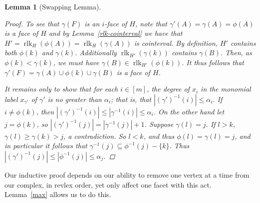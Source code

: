 \documentclass[11pt]{amsart}
\newtheorem{lemma}[theorem]{Lemma}
\theoremstyle{definition}
\numberwithin{equation}{section}
\theoremstyle{remark}
\numberwithin{equation}{section}
\begin{document}
\begin{lemma}[Swapping Lemma]
\begin{proof}
To see that $\gamma(F)$ is an $i$-face of $H$, note that $\gamma'(A) = \gamma(A) = \phi(A)$ is a face of $H$ and by Lemma~\ref{rlk-cointerval} we have that $H' = \operatorname{rlk}_{H}(\phi(A)) = \operatorname{rlk}_{H}(\gamma(A)) $ is cointerval.
By definition, $H'$ contains both $\phi(k)$ and $\gamma(k)$.
Additionally $\operatorname{rlk}_{H'}(\gamma(k))$ contains $\gamma(B)$. 
Then, as $\phi(k) < \gamma(k)$, we must have $\gamma(B) \in \operatorname{rlk}_{H'}(\phi(k))$. 
It thus follows that $\gamma'(F) = \gamma(A) \cup \phi(k) \cup \gamma(B)$ is a face of $H$. 

It remains only to show that for each $i \in [m]$, the degree of $x_i$ in the monomial label $x_{\gamma'}$ of $\gamma'$ is no greater than $\alpha_i$; that is, that $|(\gamma')^{-1}(i)| \leq \alpha_i$. 
If $i \neq \phi(k)$, then $|(\gamma')^{-1}(i)|  \leq |\gamma^{-1}(i)|  \leq \alpha_i$. 
On the other hand let $j = \phi(k)$, so $|(\gamma')^{-1}(j)| = |\gamma^{-1}(j)|  + 1$. 
Suppose $\gamma(l) = j$. 
If $l > k$, $\gamma(l) \geq \gamma(k) > j$, a contradiction. 
So $l < k$,  and thus $\phi(l) = \gamma(l) = j$, and in particular it follows that $\gamma^{-1}(j) \subseteq \phi^{-1}(j) -  \{k\}$. 
Thus $|(\gamma')^{-1}(j)| \leq |\phi^{-1}(j)| \leq \alpha_j$.
\end{proof}
\end{lemma}

Our inductive proof depends on our ability to remove one vertex at a time from our complex, in revlex order, yet only affect one facet with this act.
Lemma~\ref{max} allows us to do this.
\end{document}
